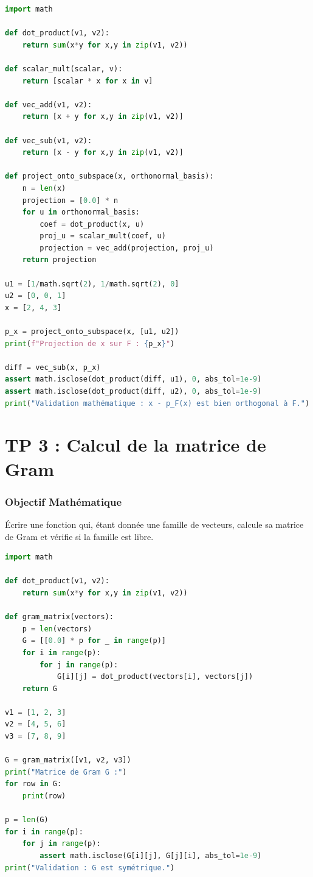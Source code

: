\documentclass{report}
\begin{document}
\begin{lstlisting}[language=Python]
import math

def dot_product(v1, v2):
    return sum(x*y for x,y in zip(v1, v2))

def scalar_mult(scalar, v):
    return [scalar * x for x in v]

def vec_add(v1, v2):
    return [x + y for x,y in zip(v1, v2)]

def vec_sub(v1, v2):
    return [x - y for x,y in zip(v1, v2)]

def project_onto_subspace(x, orthonormal_basis):
    n = len(x)
    projection = [0.0] * n
    for u in orthonormal_basis:
        coef = dot_product(x, u)
        proj_u = scalar_mult(coef, u)
        projection = vec_add(projection, proj_u)
    return projection

u1 = [1/math.sqrt(2), 1/math.sqrt(2), 0]
u2 = [0, 0, 1]
x = [2, 4, 3]

p_x = project_onto_subspace(x, [u1, u2])
print(f"Projection de x sur F : {p_x}")

diff = vec_sub(x, p_x)
assert math.isclose(dot_product(diff, u1), 0, abs_tol=1e-9)
assert math.isclose(dot_product(diff, u2), 0, abs_tol=1e-9)
print("Validation mathématique : x - p_F(x) est bien orthogonal à F.")
\end{lstlisting}

\newpage


\chapter*{TP 3 : Calcul de la matrice de Gram}

\subsection*{Objectif Mathématique}
Écrire une fonction qui, étant donnée une famille de vecteurs, calcule sa matrice de Gram et vérifie si la famille est libre.

\begin{lstlisting}[language=Python]
import math

def dot_product(v1, v2):
    return sum(x*y for x,y in zip(v1, v2))

def gram_matrix(vectors):
    p = len(vectors)
    G = [[0.0] * p for _ in range(p)]
    for i in range(p):
        for j in range(p):
            G[i][j] = dot_product(vectors[i], vectors[j])
    return G

v1 = [1, 2, 3]
v2 = [4, 5, 6]
v3 = [7, 8, 9]

G = gram_matrix([v1, v2, v3])
print("Matrice de Gram G :")
for row in G:
    print(row)

p = len(G)
for i in range(p):
    for j in range(p):
        assert math.isclose(G[i][j], G[j][i], abs_tol=1e-9)
print("Validation : G est symétrique.")
\end{lstlisting}
\end{document}
